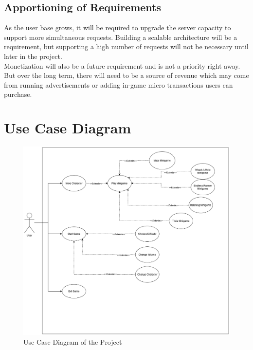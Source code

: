 \documentclass[]{article}
\begin{document}
\subsection{Apportioning of Requirements}
\label{sub:apportioning_of_requirements}
As the user base grows, it will be required to upgrade the server capacity to support more simultaneous requests. Building a scalable architecture will be a requirement, but supporting a high number of requests will not be necessary until later in the project.
\\


Monetization will also be a future requirement and is not a priority right away. But over the long term, there will need to be a source of revenue which may come from running advertisements or adding in-game micro transactions users can purchase.


\section{Use Case Diagram}
\label{sec:use_case_diagram}
\begin{figure}[H]
    \centering
    \includegraphics[width=1\textwidth]{figures/usecase.png}
    \caption{Use Case Diagram of the Project}
\end{figure}
\end{document}
